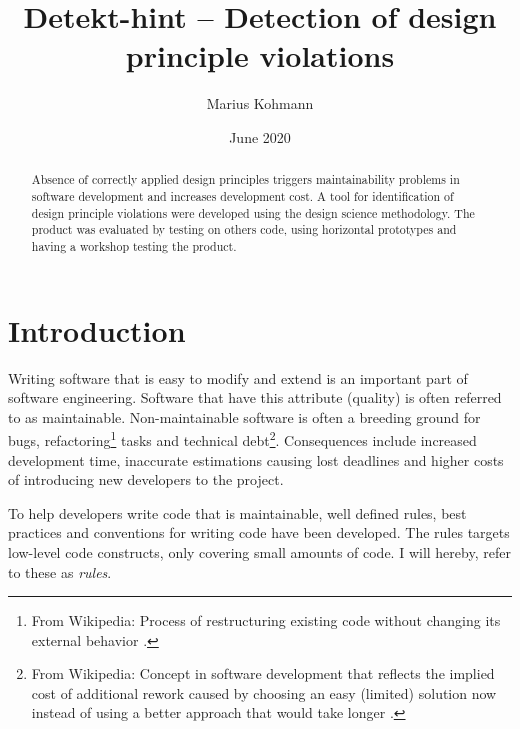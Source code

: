 \documentclass{report}
\title{Detekt-hint -- Detection of design principle violations}
\author{Marius Kohmann}
\date{June 2020}
\begin{document}
\maketitle

\begin{abstract}
	Absence of correctly applied design principles triggers maintainability problems in software development and increases development cost. A tool for identification of design principle violations were developed using the design science methodology. The product was evaluated by testing on others code, using horizontal prototypes and having a workshop testing the product. 
	
	
	
\end{abstract}


\clearpage
\tableofcontents
\clearpage
\chapter{Introduction}


Writing software that is easy to modify and extend is an important part of software engineering. Software that have this attribute (quality) is often referred to as maintainable. Non-maintainable software is often a breeding ground for bugs, refactoring\footnote{From Wikipedia: Process of restructuring existing code without changing its external behavior \cite{refactoring}.} tasks and technical debt\footnote{From Wikipedia: Concept in software development that reflects the implied cost of additional rework caused by choosing an easy (limited) solution now instead of using a better approach that would take longer \cite{technicalDebt}.}. Consequences include increased development time, inaccurate estimations causing lost deadlines and higher costs of introducing new developers to the project.

To help developers write code that is maintainable, well defined rules, best practices and conventions for writing code have been developed. The rules targets low-level code constructs, only covering small amounts of code. I will hereby, refer to these as \textit{rules}.
\end{document}
